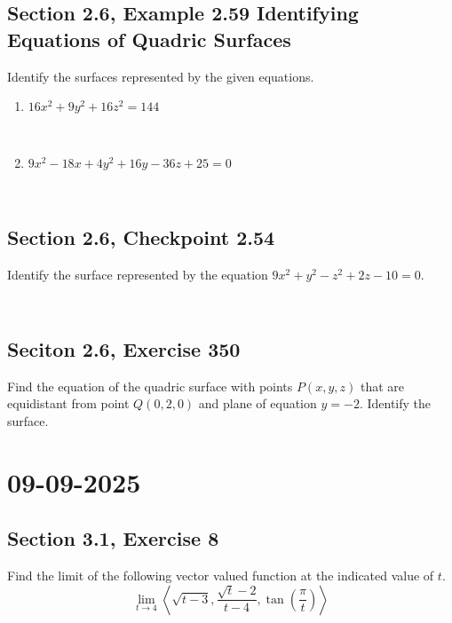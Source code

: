 \documentclass[]{mangos-musings}
\begin{document}
\subsection{Section 2.6, Example 2.59 Identifying Equations of Quadric Surfaces}
Identify the surfaces represented by the given equations.
\begin{enumerate}[label=(\alph*)]
  \item $16x^2 + 9y^2 + 16z^2 = 144$
  \begin{align*}
    \\ \\ \\ \\
  \end{align*}
  \item $9x^2 - 18x + 4y^2 + 16y - 36z + 25 = 0$
  \begin{align*}
    \\ \\ \\ \\
  \end{align*}
\end{enumerate}
\subsection{Section 2.6, Checkpoint 2.54}
Identify the surface represented by the equation $9x^2 + y^2 - z^2 + 2z - 10 = 0$.
\begin{align*}
  \\ \\ \\ \\
\end{align*}

\subsection{Seciton 2.6, Exercise 350}
Find the equation of the quadric surface with points $P(x,y,z)$ that are equidistant from point $Q(0,2,0)$ and plane of equation $y=-2$. Identify the surface. 


\newpage
\section{09-09-2025}
\subsection{Section 3.1, Exercise 8}
Find the limit of the following vector valued function at the indicated value of $t$.
\[\lim_{t\to 4}\left\langle \sqrt{t-3}, \dfrac{\sqrt{t} - 2}{t-4}, \tan\left(\dfrac{\pi}{t}\right)\right\rangle\]
\begin{align*}
  \\ \\ \\ \\
\end{align*}
\end{document}

